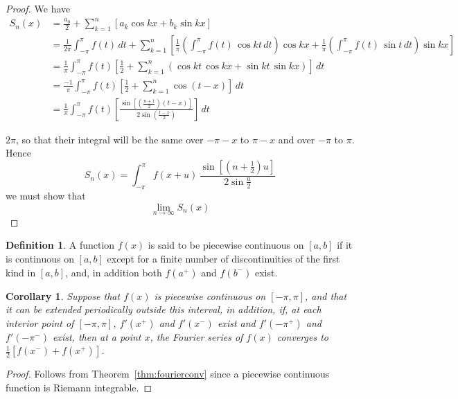 \documentclass[12pt,a4paper]{report}
\theoremstyle{definition}
\newtheorem{defn}[thm]{Definition}
\theoremstyle{plain}
\newtheorem{coro}[thm]{Corollary}
\begin{document}
\begin{proof}
We have
\begin{align*}
S_n(x) & = \frac{a_0}{2} + \sum^n_{k = 1} \left[a_k\cos kx + b_k\sin kx\right]\\
       & =  \frac{1}{2\pi}\int_{-\pi}^{\pi} f(t)\, dt + \sum^n_{k = 1} \left[\frac{1}{\pi}\left(\int_{-\pi}^{\pi}f(t)\, \cos kt\, dt\right) \cos kx + \frac{1}{\pi}\left(\int_{-\pi}^{\pi}f(t)\, \sin t\, dt\right) \sin kx\right]\\
       & = \frac{1}{\pi}\int_{-\pi}^{\pi}f(t)\left[\frac{1}{2} + \sum_{k = 1}^n\left(\cos kt \, \cos kx + \sin kt\, \sin kx\right)\right] \, dt\\
       & = \frac{-1}{\pi}\int_{-\pi}^{\pi} f(t)\left[\frac{1}{2} + \sum_{k = 1}^n\cos (t - x)\right] \, dt\\
       & = \frac{1}{\pi}\int_{-\pi}^{\pi} f(t) \left[\frac{\sin \left[\left(\frac{n+ 1}{2}\right)(t - x)\right]}{2\sin \left(\frac{t - x}{2}\right)}\right]\, dt
\end{align*}

$2\pi$, so that their integral will be the same over $-\pi-x$ to $\pi-x$ and over $-\pi$ to $\pi$. Hence
\begin{equation}
S_n(x)  = \int_{-\pi}^{\pi} f(x + u)\, \frac{\sin\left[\left(n + \frac{1}{2}\right)u\right]}{2\sin \frac{u}{2}}
\end{equation}
we must show that
$$\lim_{n\rightarrow \infty}S_n(x)$$ 
\end{proof}

















\begin{defn}
A function $f(x)$ is said to be piecewise continuous on $[a,b]$ if it is continuous on $[a,b]$ except for a finite number of discontinuities of the first kind in $[a,b]$, and, in addition both $f(a^+)$ and $f(b^-)$ exist.
\end{defn}



\begin{coro}
Suppose that $f(x)$ is piecewise continuous on $[-\pi,\pi]$, and that it can be extended periodically outside this interval, in addition, if, at each interior point of $[-\pi,\pi]$, $f'(x^+)$ and $f'(x^-)$ exist and $f'(-\pi^+)$ and $f'(-\pi^-)$ exist, then at a point $x$, the Fourier series of $f(x)$ converges to $\frac{1}{2}[f(x^-) + f(x^+)]$.
\end{coro}
\begin{proof}
Follows from Theorem~\ref{thm:fourierconv} since a piecewise continuous function is Riemann integrable.
\end{proof}
\end{document}
